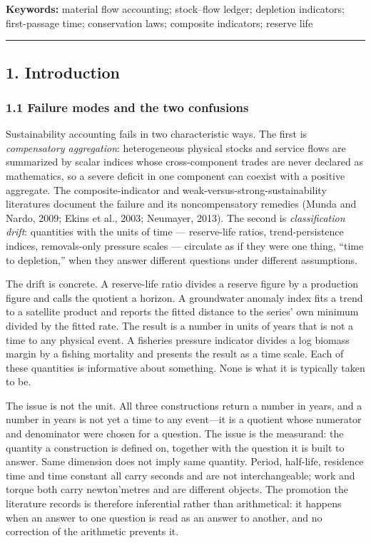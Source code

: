 \documentclass[11pt]{article}
\begin{document}
\textbf{Keywords:} material flow accounting; stock--flow ledger;
depletion indicators; first-passage time; conservation laws; composite
indicators; reserve life

\begin{center}\rule{0.5\linewidth}{0.5pt}\end{center}

\subsection{1. Introduction}\label{introduction}

\subsubsection{1.1 Failure modes and the two
confusions}\label{failure-modes-and-the-two-confusions}

Sustainability accounting fails in two characteristic ways. The first is
\emph{compensatory aggregation}: heterogeneous physical stocks and
service flows are summarized by scalar indices whose cross-component
trades are never declared as mathematics, so a severe deficit in one
component can coexist with a positive aggregate. The composite-indicator
and weak-versus-strong-sustainability literatures document the failure
and its noncompensatory remedies (Munda and Nardo, 2009; Ekins et al.,
2003; Neumayer, 2013). The second is \emph{classification drift}:
quantities with the units of time --- reserve-life ratios,
trend-persistence indices, removals-only pressure scales --- circulate
as if they were one thing, ``time to depletion,'' when they answer
different questions under different assumptions.

The drift is concrete. A reserve-life ratio divides a reserve figure by
a production figure and calls the quotient a horizon. A groundwater
anomaly index fits a trend to a satellite product and reports the fitted
distance to the series' own minimum divided by the fitted rate. The
result is a number in units of years that is not a time to any physical
event. A fisheries pressure indicator divides a log biomass margin by a
fishing mortality and presents the result as a time scale. Each of these quantities is informative about something. None is what it is typically taken to be.

The issue is not the unit. All three constructions return a number in years, and a number in years is not yet a time to any event---it is a quotient whose numerator and denominator were chosen for a question. The issue is the measurand: the quantity a construction is defined on, together with the question it is built to answer. Same dimension does not imply same quantity. Period, half-life, residence time and time constant all carry seconds and are not interchangeable; work and torque both carry newton'metres and are different objects. The promotion the literature records is therefore inferential rather than arithmetical: it happens when an answer to one question is read as an answer to another, and no correction of the arithmetic prevents it.
\end{document}
